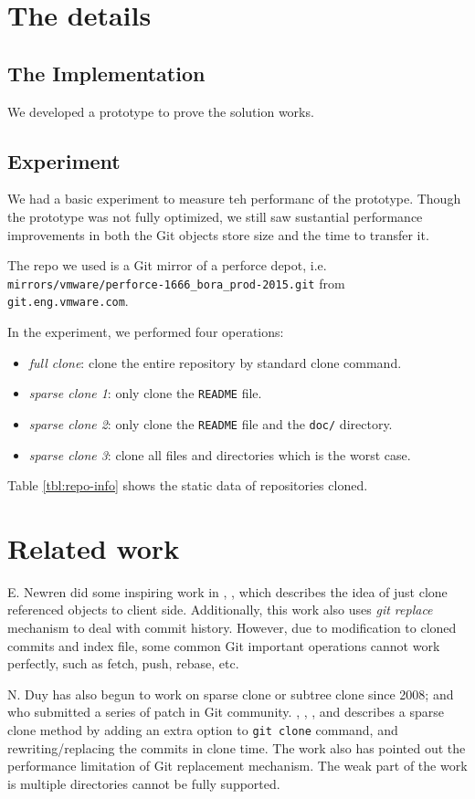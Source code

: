 \documentclass[preprint]{sigplanconf}
\begin{document}
\section{The details}
\subsection{The Implementation}
We developed a prototype to prove the solution works.

\subsection{Experiment}
We had a basic experiment to measure teh performanc of the prototype.
Though the prototype was not fully optimized, we still saw sustantial
performance improvements in both the Git objects store size and the time to
transfer it.

The repo we used is a Git mirror of a perforce depot, i.e.
\verb|mirrors/vmware/perforce-1666_bora_prod-2015.git| from
\verb|git.eng.vmware.com|.

In the experiment, we performed four operations:
\begin{itemize}
  \item \emph{full clone}: clone the entire repository by standard clone
    command.
  \item \emph{sparse clone 1}: only clone the \verb|README| file.
  \item \emph{sparse clone 2}: only clone the \verb|README| file and the
  \verb|doc/| directory.
  \item \emph{sparse clone 3}: clone all files and directories which is the
    worst case.
\end{itemize}
Table \ref{tbl:repo-info} shows the static data of repositories cloned.



\section{Related work}
E. Newren did some inspiring work in \cite{newren10-0}, \cite{newren10-1},
which describes the idea of just clone referenced objects to client side.
Additionally, this work also uses \emph{git replace} mechanism to deal with
commit history.
However, due to modification to cloned commits and index file, some common Git
important operations cannot work perfectly, such as fetch, push, rebase, etc.

N. Duy has also begun to work on sparse clone or subtree clone since 2008; and
who submitted a series of patch in Git community.
\cite{duy08}, \cite{duy10-1}, \cite{duy10-2}, and \cite{duy10-3} describes a
sparse clone method by adding an extra option to \verb|git clone| command, and
rewriting/replacing the commits in clone time.
The work also has pointed out the performance limitation of Git replacement
mechanism.
The weak part of the work is multiple directories cannot be fully supported.
\end{document}
